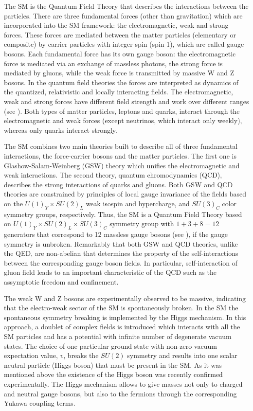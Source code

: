 The SM is the Quantum Field Theory that describes the interactions between the particles.
There are three fundamental forces (other than gravitation) which are incorporated into the SM framework: the electromagnetic, weak and strong forces. These forces are mediated between the matter particles (elementary or composite) by carrier particles with integer spin (spin 1), which are called gauge bosons.
Each fundamental force has its own gauge boson: the electromagnetic force is mediated via an exchange of massless photons, the strong force is mediated by gluons, while the weak force is transmitted by massive W and Z bosons.
In the quantum field theories the forces are interpreted as dynamics of the quantized, relativistic and locally interacting fields.
The electromagnetic, weak and strong forces have different field strength and work over different ranges (see ). 
Both types of matter particles, leptons and quarks, interact through the electromagnetic and weak forces (except neutrinos, which interact only weekly), whereas only quarks interact strongly.

The SM combines two main theories built to describe all of three fundamental interactions, the force-carrier bosons and the matter particles. The first one is Glashow-Salam-Weinberg (GSW) theory which unifies the electromagnetic and weak interactions. The second theory, quantum chromodynamics (QCD), describes the strong interactions of quarks and gluons. Both GSW and QCD theories are constrained by principles of local gauge invariance of the fields based on the $U(1)_Y\times SU(2)_{L}$ weak isospin and hypercharge, and $SU(3)_C$ color symmetry groups, respectively. Thus, the SM is a Quantum Field Theory based on $U(1)_Y\times SU(2)_{L}\times SU(3)_C$ symmetry group with $1+3+8=12$ generators that correspond to 12 massless gauge bosons (see ), if the gauge symmetry is unbroken. Remarkably that both GSW and QCD theories, unlike the QED, are non-abelian that determines the property of the self-interactions between the corresponding gauge boson fields. In particular, self-interaction of gluon field leads to an important characteristic of the QCD such as the assymptotic freedom and confinement.

The weak W and Z bosons are experimentally observed to be massive, indicating that the electro-weak sector of the SM is spontaneously broken. 
In the SM the spontaneous symmetry breaking is implemented by the Higgs mechanism. In this approach,
a doublet of complex fields is introduced which interacts with all the SM particles and has a potential with infinite number of degenerate vacuum states. 
The choice of one particular ground state with non-zero vacuum expectation value, $v$, breaks the $SU(2)$ symmetry and results into one scalar neutral particle (Higgs boson) that must be present in the SM. As it was mentioned above the existence of the Higgs boson was recently confirmed experimentally.
The Higgs mechanism allows to give masses not only to charged and neutral gauge bosons, but also to the fermions through the corresponding Yukawa coupling terms.

